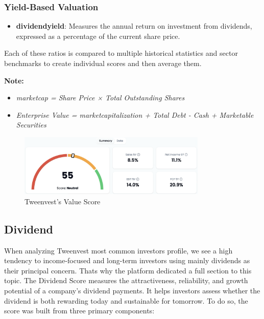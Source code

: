 \documentclass[11pt,english,a4paper,hidelinks]{book}
\begin{document}
\subsubsection{Yield-Based Valuation}
\begin{itemize}
    \item \textbf{\acrshort{dividendyield}}: Measures the annual return on investment from dividends, expressed as a percentage of the current share price.
\end{itemize}

\vspace{0.5cm}
\noindent Each of these ratios is compared to multiple historical statistics and sector benchmarks to create individual scores and then average them.

\vspace{0.5cm}
\noindent \textbf{Note:}
\begin{itemize}
    \item \textit{\acrshort{marketcap} = Share Price × Total Outstanding Shares}
    \item \textit{Enterprise Value = \acrshort{marketcap}italization + Total Debt - Cash + Marketable Securities}
\end{itemize}

\begin{figure}[H]
    \centering
    \includegraphics[width=0.8\textwidth]{images/tweenvest/value score.png}
    \caption{Tweenvest's Value Score}
    \label{fig:valuation_score}
\end{figure}


\subsection{Dividend}
\noindent When analyzing Tweenvest most common investors profile, we see a high tendency to income-focused and long-term investors using mainly dividends as their principal concern. Thats why the platform dedicated a full section to this topic. The Dividend Score measures the attractiveness, reliability, and growth potential of a company's dividend payments. It helps investors assess whether the dividend is both rewarding today and sustainable for tomorrow. To do so, the score was built from three primary components:
\end{document}
